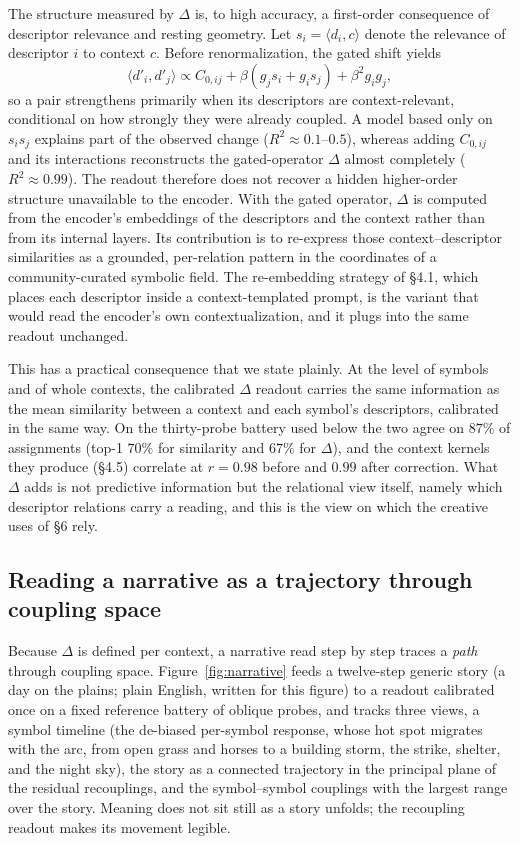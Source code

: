 \documentclass[final,creativeai]{article}
\begin{document}
The structure measured by $\Delta$ is, to high accuracy, a first-order consequence of descriptor relevance and resting geometry. Let $s_i=\langle d_i,c\rangle$ denote the relevance of descriptor $i$ to context $c$. Before renormalization, the gated shift yields
\[
\langle d'_i,d'_j\rangle
\propto
C_{0,ij}
+\beta(g_j s_i+g_i s_j)
+\beta^2g_ig_j ,
\]
so a pair strengthens primarily when its descriptors are context-relevant, conditional on how strongly they were already coupled. A model based only on $s_i s_j$ explains part of the observed change ($R^2\approx0.1$--$0.5$), whereas adding $C_{0,ij}$ and its interactions reconstructs the gated-operator $\Delta$ almost completely ($R^2\approx0.99$). The readout therefore does not recover a hidden higher-order structure unavailable to the encoder. With the gated operator, $\Delta$ is computed from the encoder's embeddings of the descriptors and the context rather than from its internal layers. Its contribution is to re-express those context--descriptor similarities as a grounded, per-relation pattern in the coordinates of a community-curated symbolic field. The re-embedding strategy of \S4.1, which places each descriptor inside a context-templated prompt, is the variant that would read the encoder's own contextualization, and it plugs into the same readout unchanged.

This has a practical consequence that we state plainly. At the level of symbols and of whole contexts, the calibrated $\Delta$ readout carries the same information as the mean similarity between a context and each symbol's descriptors, calibrated in the same way. On the thirty-probe battery used below the two agree on $87\%$ of assignments (top-1 $70\%$ for similarity and $67\%$ for $\Delta$), and the context kernels they produce (\S4.5) correlate at $r=0.98$ before and $0.99$ after correction. What $\Delta$ adds is not predictive information but the relational view itself, namely which descriptor relations carry a reading, and this is the view on which the creative uses of \S6 rely.

\subsection{Reading a narrative as a trajectory through coupling space}
Because $\Delta$ is defined per context, a narrative read step by step traces a \emph{path} through coupling space. Figure~\ref{fig:narrative} feeds a twelve-step generic story (a day on the plains; plain English, written for this figure) to a readout calibrated once on a fixed reference battery of oblique probes, and tracks three views, a symbol timeline (the de-biased per-symbol response, whose hot spot migrates with the arc, from open grass and horses to a building storm, the strike, shelter, and the night sky), the story as a connected trajectory in the principal plane of the residual recouplings, and the symbol--symbol couplings with the largest range over the story. Meaning does not sit still as a story unfolds; the recoupling readout makes its movement legible.
\end{document}
